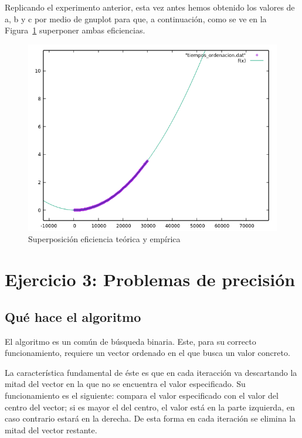 Replicando el experimento anterior, esta vez antes hemos obtenido los valores de a, b y c por medio de gnuplot para que, a continuación, como se ve en la Figura~\ref{fig:figura2-1} superponer ambas eficiencias.
\begin{figure}[H] %
\centering
\includegraphics[scale=0.8]{ejercicio2/ejercicio2-1.png}  %
\caption{Superposición eficiencia teórica y empírica} 
\label{fig:figura2-1}
\end{figure}

\newpage
\section{Ejercicio 3: Problemas de precisión}
\subsection{Qué hace el algoritmo}
El algoritmo es un común de búsqueda binaria. Este, para su correcto funcionamiento, requiere un vector ordenado en el que busca un valor concreto. 

La característica fundamental de éste es que en cada iteracción va descartando la mitad del vector en la que no se encuentra el valor especificado. Su funcionamiento es el siguiente: compara el valor especificado con el valor del centro del vector; si es mayor el del centro, el valor está en la parte izquierda, en caso contrario estará en la derecha. De esta forma en cada iteración se elimina la mitad del
vector restante. 

